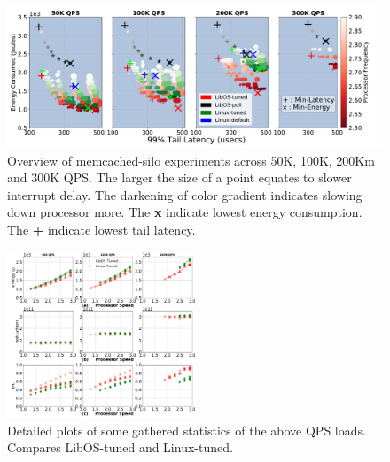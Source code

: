 \begin{figure}
\centering
\includegraphics[width=1\textwidth]{figures/mcdsilo_overview}
\vspace*{-8mm}
\caption[]
{Overview of memcached-silo experiments across 50K, 100K, 200Km and 300K QPS. The larger the size of a point equates to slower interrupt delay. The darkening of color gradient indicates slowing down processor more. The \textbf{x} indicate lowest energy consumption. The \textbf{+} indicate lowest tail latency.}
\label{fig:mcdsilo_overview}
\end{figure}

\begin{figure}
\includegraphics[width=0.5\textwidth]{figures/mcdsilo_detail}
\vspace*{-8mm}
\caption[]{Detailed plots of some gathered statistics of the above QPS loads. Compares LibOS-tuned and Linux-tuned.}
\label{fig:mcdsilo_detail}
\end{figure}

